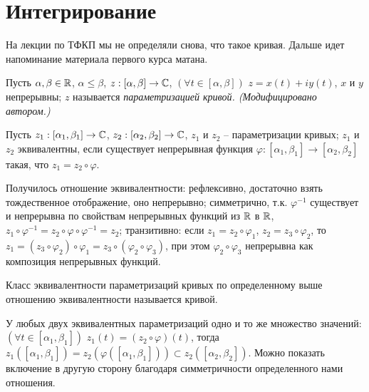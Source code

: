 
\section{Интегрирование}

На лекции по ТФКП мы не определяли снова, что такое кривая. Дальше идет напоминание материала первого курса матана.

\begin{definition}
	Пусть $\alpha, \beta \in \mathbb{R}$, $\alpha \leq \beta$, $z: [\alpha, \beta] \to \mathbb{C}$, $(\forall t \in [\alpha, \beta]) \,\, z = x(t) + i y(t)$, $x$ и $y$ непрерывны; $z$ называется \it{параметризацией кривой}. (Модифицировано автором.)
\end{definition}

\begin{definition}
	Пусть $z_1: [\alpha_1, \beta_1] \to \mathbb{C}$, $z_2: [\alpha_2, \beta_2] \to \mathbb{C}$, $z_1$ и $z_2$ -- параметризации кривых; $z_1$ и $z_2$ эквивалентны, если существует непрерывная функция $\varphi: [\alpha_1, \beta_1] \to [\alpha_2, \beta_2]$ такая, что $z_1 = z_2 \circ \varphi$.
\end{definition}

\begin{anote}
	Получилось отношение эквивалентности: рефлексивно, достаточно взять тождественное отображение, оно непрерывно; симметрично, т.к. $\varphi^{-1}$ существует и непрерывна по свойствам непрерывных функций из $\mathbb{R}$ в $\mathbb{R}$, $z_1 \circ \varphi^{-1} = z_2 \circ \varphi \circ \varphi^{-1} = z_2$; транзитивно: если $z_1 = z_2 \circ \varphi_1$, $z_2 = z_3 \circ \varphi_2$, то $z_1 = (z_3 \circ \varphi_2) \circ \varphi_1 = z_3 \circ (\varphi_2 \circ \varphi_3)$, при этом $\varphi_2 \circ \varphi_3$ непрерывна как композиция непрерывных функций.
\end{anote}

\begin{definition}
	Класс эквивалентности параметризаций кривых по определенному выше отношению эквивалентности называется кривой.
\end{definition}

\begin{anote}
	У любых двух эквивалентных параметризаций одно и то же множество значений: $(\forall t \in [\alpha_1, \beta_1]) \, \, z_1(t) = (z_2 \circ \varphi)(t)$, тогда $z_1([\alpha_1, \beta_1]) = z_2(\varphi([\alpha_1, \beta_1])) \subset z_2([\alpha_2, \beta_2])$. Можно показать включение в другую сторону благодаря симметричности определенного нами отношения.
\end{anote}

